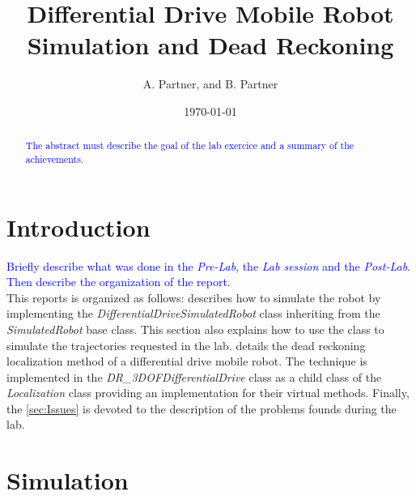 \documentclass[letterpaper,12pt]{article}
\begin{document}
\title{Differential Drive Mobile Robot Simulation and Dead Reckoning}
\author{A. Partner,  and B. Partner}
\date{\today}
\maketitle

\begin{abstract}
\textcolor{blue}{The abstract must describe the goal of the lab exercice and a summary of the achievements.}
\end{abstract}

   


\section{Introduction}
\textcolor{blue}{Briefly describe what was done in the \emph{Pre-Lab}, the \emph{Lab session} and the \emph{Post-Lab}. Then describe the organization of the report}.\\
This reports is organized as follows:  describes how to simulate the robot by implementing the \emph{DifferentialDriveSimulatedRobot} class inheriting from the \emph{SimulatedRobot} base class. This section also explains how to use the class to simulate the trajectories requested in the lab.  details the dead reckoning localization method of a differential drive mobile robot. The technique is implemented in the \emph{DR\_3DOFDifferentialDrive} class as a child class of the \emph{Localization} class providing an implementation for their virtual methods. Finally, the \cref{sec:Issues} is devoted to the description of the problems founds during the lab.

\section{Simulation}
\label{sec:Simulation}
\end{document}
